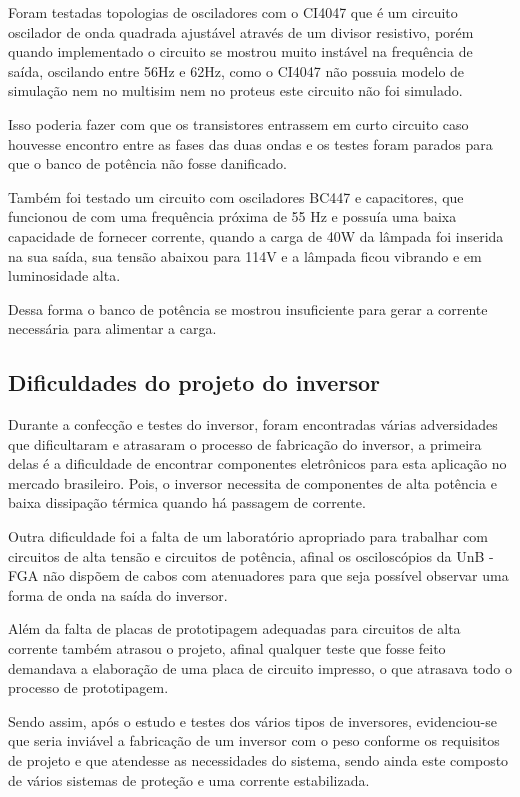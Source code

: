 Foram testadas topologias de osciladores com o CI4047 que é um circuito oscilador de onda quadrada ajustável através de um divisor resistivo, porém quando implementado o circuito se mostrou muito instável na frequência de saída, oscilando entre 56Hz e 62Hz, como o CI4047 não possuia modelo de simulação nem no multisim nem no proteus este circuito não foi simulado.

Isso poderia fazer com que os transistores entrassem em curto circuito caso houvesse encontro entre as fases das duas ondas e os testes foram parados para que o banco de potência não fosse danificado.

Também foi testado um circuito com osciladores BC447 e capacitores, que funcionou de com uma frequência próxima de 55 Hz e possuía uma baixa capacidade de fornecer corrente, quando a carga de 40W da lâmpada foi inserida na sua saída, sua tensão abaixou para 114V e a lâmpada ficou vibrando e em luminosidade alta.

Dessa forma o banco de potência  se mostrou insuficiente para gerar a corrente necessária para alimentar a carga.

\subsection{Dificuldades do projeto do inversor}
Durante a confecção e testes do inversor, foram encontradas várias adversidades que dificultaram e atrasaram o processo de fabricação do inversor, a primeira delas é a dificuldade de encontrar componentes eletrônicos para esta aplicação no  mercado brasileiro. Pois, o inversor necessita de componentes de alta potência e baixa dissipação térmica quando há passagem de corrente.

Outra dificuldade foi a falta de um laboratório apropriado para trabalhar com circuitos de alta tensão e circuitos de potência, afinal os osciloscópios da UnB - FGA não dispõem de cabos com atenuadores para que seja possível observar uma forma de onda na saída do inversor.

Além da falta de placas de prototipagem adequadas para circuitos de alta corrente também atrasou o projeto, afinal qualquer teste que fosse feito demandava a elaboração de uma placa de circuito impresso, o que atrasava todo o processo de prototipagem.

Sendo assim, após o estudo e testes dos vários tipos de inversores, evidenciou-se que seria inviável a fabricação de um inversor com o peso conforme os requisitos de projeto e que atendesse as necessidades do sistema, sendo ainda este composto de vários sistemas de proteção e uma corrente estabilizada.

